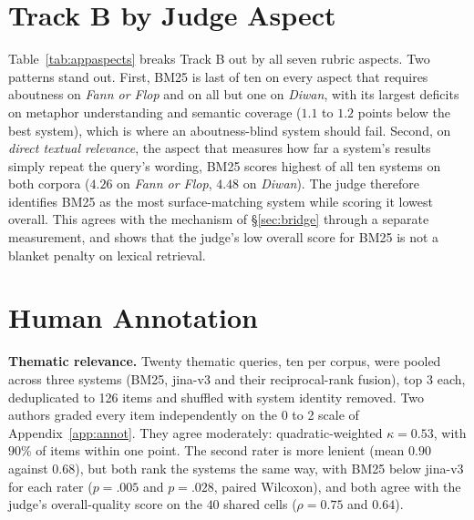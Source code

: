 \documentclass[11pt]{article}
\begin{document}
\begin{table}[h]
\centering\small
\setlength{\tabcolsep}{4pt}

\caption{Track B overall quality under the primary judge (Gemini 3.5 Flash) and the open-weights second judge (Gemma-3-27B-it), on the $100$ thematic queries scored by both. Scales differ; the orderings do not (Kendall $\tau{=}{+}0.81$ on \textit{Fann or Flop}, ${+}0.85$ on \textit{Diwan}).}
\label{tab:appjudge2}
\end{table}

\begin{table}[t!]
\centering\small

\caption{Cell-level Spearman agreement between the two judges, $n{=}2{,}000$ paired cells.}
\label{tab:appjudge2rho}
\end{table}

\section{Track B by Judge Aspect}
\label{app:aspects}
Table~\ref{tab:appaspects} breaks Track B out by all seven rubric aspects. Two patterns stand out. First, BM25 is last of ten on every aspect that requires aboutness on \textit{Fann or Flop} and on all but one on \textit{Diwan}, with its largest deficits on metaphor understanding and semantic coverage ($1.1$ to $1.2$ points below the best system), which is where an aboutness-blind system should fail. Second, on \emph{direct textual relevance}, the aspect that measures how far a system's results simply repeat the query's wording, BM25 scores highest of all ten systems on both corpora ($4.26$ on \textit{Fann or Flop}, $4.48$ on \textit{Diwan}). The judge therefore identifies BM25 as the most surface-matching system while scoring it lowest overall. This agrees with the mechanism of \S\ref{sec:bridge} through a separate measurement, and shows that the judge's low overall score for BM25 is not a blanket penalty on lexical retrieval.

\section{Human Annotation}
\label{app:human}
\textbf{Thematic relevance.} Twenty thematic queries, ten per corpus, were pooled across three systems (BM25, jina-v3 and their reciprocal-rank fusion), top 3 each, deduplicated to 126 items and shuffled with system identity removed. Two authors graded every item independently on the 0 to 2 scale of Appendix~\ref{app:annot}. They agree moderately: quadratic-weighted $\kappa{=}0.53$, with $90\%$ of items within one point. The second rater is more lenient (mean $0.90$ against $0.68$), but both rank the systems the same way, with BM25 below jina-v3 for each rater ($p{=}.005$ and $p{=}.028$, paired Wilcoxon), and both agree with the judge's overall-quality score on the $40$ shared cells ($\rho{=}0.75$ and $0.64$).
\end{document}
